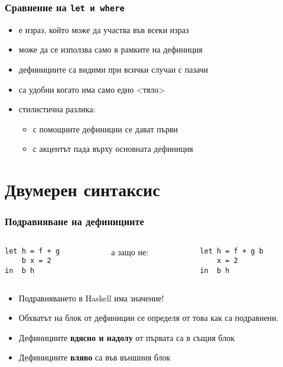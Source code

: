 \documentclass{beamer}
\begin{document}
\begin{frame}
  \frametitle{Сравнение на \tt{let} и \tt{where}}

  \begin{itemize}[<+->]
  \item {} е израз, който може да участва във всеки израз
  \item {} може да се използва само в рамките на дефиниция
  \item {} дефинициите са видими при всички случаи с пазачи
  \item {} са удобни когато има само едно <тяло>
  \item стилистична разлика:
    \begin{itemize}
    \item с  помощните дефиниции се дават първи
    \item с  акцентът пада върху основната дефиниция
    \end{itemize}
  \end{itemize}
\end{frame}

\section{Двумерен синтаксис}

\begin{frame}[fragile]
  \frametitle{Подравняване на дефинициите}

  \begin{columns}[onlytextwidth]
    \begin{column}{0.35\textwidth}
\begin{lstlisting}
let h = f + g
    b x = 2
in  b h
\end{lstlisting}
    \end{column}
    \pause
    \begin{column}{0.3\textwidth}
      а защо не:
    \end{column}
    \begin{column}{0.35\textwidth}
\begin{lstlisting}
let h = f + g b
    x = 2
in  b h
\end{lstlisting}
    \end{column}
  \end{columns}
  \vspace{1em}
\onslide<+->
\begin{itemize}[<+->]
\item \alert{Подравняването в Haskell има значение!}
\item Обхватът на блок от дефиниции се определя от това как са подравнени.
\item Дефинициите \textbf{вдясно и надолу} от първата са в същия блок
\item Дефинициите \textbf{вляво} са във външния блок
\end{itemize}
\end{frame}
\end{document}
